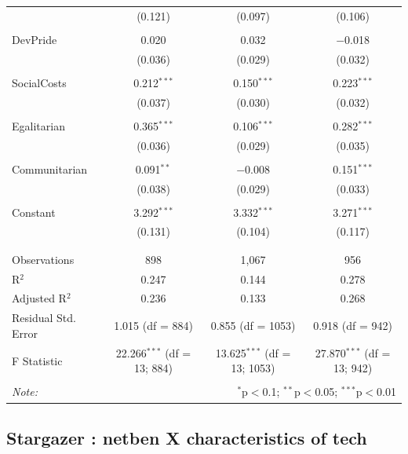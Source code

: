 \documentclass[
]{article}
\begin{document}
\begin{table}[!htbp]
\begin{tabular}{@{\extracolsep{5pt}}lccc}
  & (0.121) & (0.097) & (0.106) \\ 
  & & & \\ 
 DevPride & 0.020 & 0.032 & $-$0.018 \\ 
  & (0.036) & (0.029) & (0.032) \\ 
  & & & \\ 
 SocialCosts & 0.212$^{***}$ & 0.150$^{***}$ & 0.223$^{***}$ \\ 
  & (0.037) & (0.030) & (0.032) \\ 
  & & & \\ 
 Egalitarian & 0.365$^{***}$ & 0.106$^{***}$ & 0.282$^{***}$ \\ 
  & (0.036) & (0.029) & (0.035) \\ 
  & & & \\ 
 Communitarian & 0.091$^{**}$ & $-$0.008 & 0.151$^{***}$ \\ 
  & (0.038) & (0.029) & (0.033) \\ 
  & & & \\ 
 Constant & 3.292$^{***}$ & 3.332$^{***}$ & 3.271$^{***}$ \\ 
  & (0.131) & (0.104) & (0.117) \\ 
  & & & \\ 
\hline \\[-1.8ex] 
Observations & 898 & 1,067 & 956 \\ 
R$^{2}$ & 0.247 & 0.144 & 0.278 \\ 
Adjusted R$^{2}$ & 0.236 & 0.133 & 0.268 \\ 
Residual Std. Error & 1.015 (df = 884) & 0.855 (df = 1053) & 0.918 (df = 942) \\ 
F Statistic & 22.266$^{***}$ (df = 13; 884) & 13.625$^{***}$ (df = 13; 1053) & 27.870$^{***}$ (df = 13; 942) \\ 
\hline 
\hline \\[-1.8ex] 
\textit{Note:}  & \multicolumn{3}{r}{$^{*}$p$<$0.1; $^{**}$p$<$0.05; $^{***}$p$<$0.01} \\ 
\end{tabular} 
\end{table} 
\endgroup

\newpage

\hypertarget{stargazer-netben-x-characteristics-of-tech}{%
\subsection{Stargazer : netben X characteristics of
tech}\label{stargazer-netben-x-characteristics-of-tech}}
\end{document}
